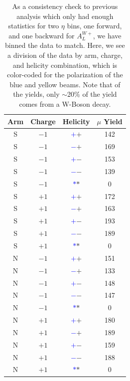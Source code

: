 \begin{table}
  \centering
  \begin{tabular}{cccc}
    \toprule
    \textbf{Arm} &
    \textbf{Charge} & 
    \textbf{Helicity} & 
    \textbf{$\mu$ Yield} \\ 
    \midrule
    S & $-1$ & \textbf{\textcolor{blue}{$+$}\textcolor{ucrgold}{$+$}}& 142 \\
    S & $-1$ & \textbf{\textcolor{blue}{$-$}\textcolor{ucrgold}{$+$}}& 169 \\
    S & $-1$ & \textbf{\textcolor{blue}{$+$}\textcolor{ucrgold}{$-$}}& 153 \\
    S & $-1$ & \textbf{\textcolor{blue}{$-$}\textcolor{ucrgold}{$-$}}& 139 \\
    S & $-1$ & \textbf{\textcolor{blue}{$*$}\textcolor{ucrgold}{$*$}}& 0 \\
    S & $+1$ & \textbf{\textcolor{blue}{$+$}\textcolor{ucrgold}{$+$}}& 172 \\
    S & $+1$ & \textbf{\textcolor{blue}{$-$}\textcolor{ucrgold}{$+$}}& 163 \\
    S & $+1$ & \textbf{\textcolor{blue}{$+$}\textcolor{ucrgold}{$-$}}& 193 \\
    S & $+1$ & \textbf{\textcolor{blue}{$-$}\textcolor{ucrgold}{$-$}}& 189 \\
    S & $+1$ & \textbf{\textcolor{blue}{$*$}\textcolor{ucrgold}{$*$}}& 0 \\
    N & $-1$ & \textbf{\textcolor{blue}{$+$}\textcolor{ucrgold}{$+$}}& 151 \\
    N & $-1$ & \textbf{\textcolor{blue}{$-$}\textcolor{ucrgold}{$+$}}& 133 \\
    N & $-1$ & \textbf{\textcolor{blue}{$+$}\textcolor{ucrgold}{$-$}}& 148 \\
    N & $-1$ & \textbf{\textcolor{blue}{$-$}\textcolor{ucrgold}{$-$}}& 147 \\
    N & $-1$ & \textbf{\textcolor{blue}{$*$}\textcolor{ucrgold}{$*$}}& 0 \\
    N & $+1$ & \textbf{\textcolor{blue}{$+$}\textcolor{ucrgold}{$+$}}& 180 \\
    N & $+1$ & \textbf{\textcolor{blue}{$-$}\textcolor{ucrgold}{$+$}}& 189 \\
    N & $+1$ & \textbf{\textcolor{blue}{$+$}\textcolor{ucrgold}{$-$}}& 159 \\
    N & $+1$ & \textbf{\textcolor{blue}{$-$}\textcolor{ucrgold}{$-$}}& 188 \\
    N & $+1$ & \textbf{\textcolor{blue}{$*$}\textcolor{ucrgold}{$*$}}& 0 \\
    \bottomrule
  \end{tabular}
  \caption{
    As a consistency check to previous analysis which only had enough statistics
    for two $\eta$ bins, one forward, and one backward for $A_L^{W+}$, we have
    binned the data to match. Here, we see a division of the data by arm,
    charge, and helicity combination, which is color-coded for the polarization
    of the blue and yellow beams. Note that of the yields, only $\sim$20\%
    of the yield comes from a W-Boson decay.
  }
  \label{tab:sorted_muons_standard}
\end{table}

